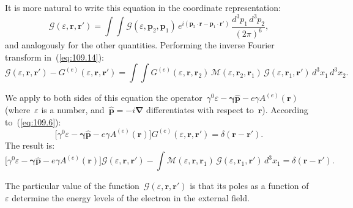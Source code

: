It is more natural to write this equation in the coordinate representation:
\begin{equation}
\mathcal{G}(\varepsilon, \mathbf{r}, \mathbf{r}') = \int\!\!\int \mathcal{G}(\varepsilon, \mathbf{p}_2, \mathbf{p}_1)\,e^{i(\mathbf{p}_2\cdot\mathbf{r} - \mathbf{p}_1\cdot\mathbf{r}')}\,\frac{d^3p_1\,d^3p_2}{(2\pi)^6},
\label{eq:109.15}
\end{equation}
and analogously for the other quantities. Performing the inverse Fourier transform in~(\ref{eq:109.14}):
\[
\mathcal{G}(\varepsilon, \mathbf{r}, \mathbf{r}') - G^{(e)}(\varepsilon, \mathbf{r}, \mathbf{r}') = \int\!\!\int G^{(e)}(\varepsilon, \mathbf{r}, \mathbf{r}_2)\,\mathcal{M}(\varepsilon, \mathbf{r}_2, \mathbf{r}_1)\,\mathcal{G}(\varepsilon, \mathbf{r}_1, \mathbf{r}')\,d^3x_1\,d^3x_2.
\]


We apply to both sides of this equation the operator~$\gamma^0\varepsilon - \boldsymbol{\gamma}\hat{\mathbf{p}} - e\gamma A^{(e)}(\mathbf{r})$ (where~$\varepsilon$ is a number, and~$\hat{\mathbf{p}} = -i\boldsymbol{\nabla}$ differentiates with respect to~$\mathbf{r}$). According to~(\ref{eq:109.6}):
\begin{equation}
\bigl[\gamma^0\varepsilon - \boldsymbol{\gamma}\hat{\mathbf{p}} - e\gamma A^{(e)}(\mathbf{r})\bigr]G^{(e)}(\varepsilon, \mathbf{r}, \mathbf{r}') = \delta(\mathbf{r} - \mathbf{r}').
\label{eq:109.16}
\end{equation}
The result is:
\begin{equation}
\bigl[\gamma^0\varepsilon - \boldsymbol{\gamma}\hat{\mathbf{p}} - e\gamma A^{(e)}(\mathbf{r})\bigr]\mathcal{G}(\varepsilon, \mathbf{r}, \mathbf{r}') - \int\!\mathcal{M}(\varepsilon, \mathbf{r}, \mathbf{r}_1)\,\mathcal{G}(\varepsilon, \mathbf{r}_1, \mathbf{r}')\,d^3x_1 = \delta(\mathbf{r} - \mathbf{r}').
\label{eq:109.17}
\end{equation}

The particular value of the function~$\mathcal{G}(\varepsilon, \mathbf{r}, \mathbf{r}')$ is that its poles as a function of~$\varepsilon$ determine the energy levels of the electron in the external field.

